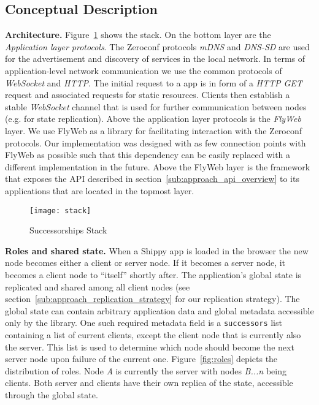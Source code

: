 \subsection{Conceptual Description}
\label{sub:approach_conceptual_description}

\textbf{Architecture.} 
Figure~\ref{fig:stack} shows the \APIName stack.
On the bottom layer are the \textit{Application layer protocols}.
The Zeroconf protocols \textit{mDNS} and \textit{DNS-SD} are used for the advertisement and discovery of \APIshort services in the local network. 
In terms of application-level network communication we use the common protocols of \textit{WebSocket} and \textit{HTTP}. 
The initial request to a \APIshort app is in form of a \textit{HTTP GET} request and associated requests for static resources.  Clients then establish a stable \textit{WebSocket} channel that is used for further communication between nodes (e.g. for state replication). 
Above the application layer protocols is the \textit{FlyWeb} layer. 
We use FlyWeb as a library for facilitating interaction with the Zeroconf protocols. 
Our implementation was designed with as few connection points with FlyWeb as possible such that this dependency can be easily replaced with a different implementation in the future. 
Above the FlyWeb layer is the \textit{\APIName} framework that exposes the API described in section~\ref{sub:approach_api_overview} to its applications that are located in the topmost layer.

\begin{figure}[h]
    \centering
    \texttt{[image: stack]}
    \caption{Successorships Stack}
    \label{fig:stack}
\end{figure}

\noindent\textbf{Roles and shared state.} When a Shippy app is loaded in the browser the new node becomes either a client or server node. 
If it becomes a server node, it becomes a client node to ``itself'' shortly after. 
The application's global state is replicated and shared among all client nodes (see section~\ref{sub:approach_replication_strategy} for our replication strategy). 
The global state can contain arbitrary application data and global metadata accessible only by the \APIshort library. 
One such required metadata field is a \texttt{successors} list containing a list of current clients, except the client node that is currently also the server. 
This list is used to determine which node should become the next server node upon failure of the current one. 
Figure~\ref{fig:roles} depicts the distribution of roles. Node \textit{A} is currently the server with nodes \textit{B...n} being clients. 
Both server and clients have their own replica of the state, accessible through the global state.

